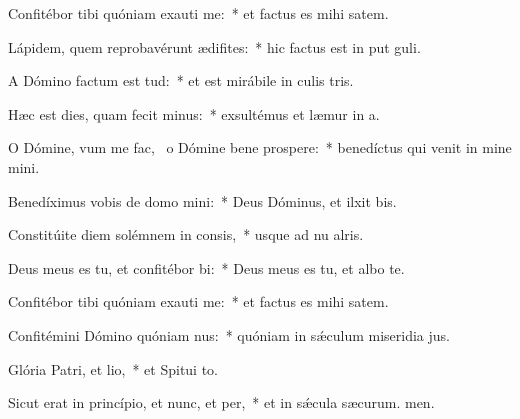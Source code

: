 \item Confitébor tibi quóniam exauti me:~* et factus es mihi  satem.
\item Lápidem, quem reprobavérunt ædifites:~* hic factus est in put guli.
\item A Dómino factum est tud:~* et est mirábile in culis tris.
\item Hæc est dies, quam fecit minus:~* exsultémus et læmur in a.
\item O Dómine, vum me fac,~\pscross{} o Dómine bene prospere:~* benedíctus qui venit in mine mini.
\item Benedíximus vobis de domo mini:~* Deus Dóminus, et ilxit bis.
\item Constitúite diem solémnem in consis,~* usque ad nu alris.
\item Deus meus es tu, et confitébor bi:~* Deus meus es tu, et albo te.
\item Confitébor tibi quóniam exauti me:~* et factus es mihi  satem.
\item Confitémini Dómino quóniam nus:~* quóniam in sǽculum miseridia jus.
\item Glória Patri, et lio,~* et Spitui to.
\item Sicut erat in princípio, et nunc, et per,~* et in sǽcula sæcurum. men.
